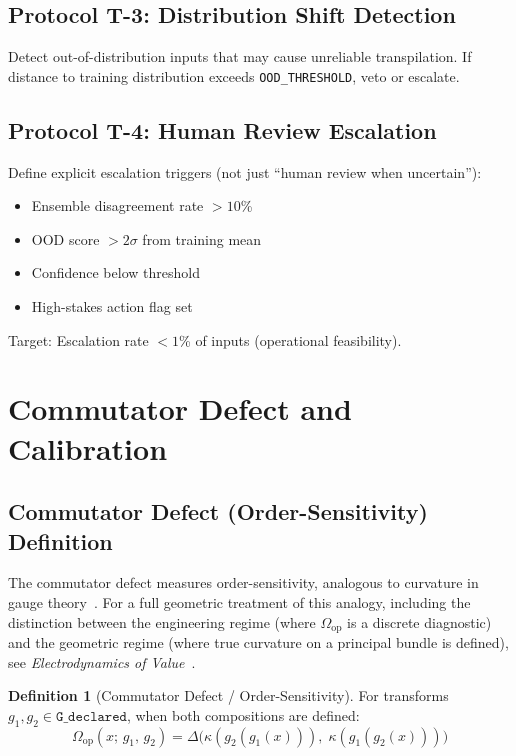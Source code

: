 \documentclass[11pt,letterpaper]{article}
\theoremstyle{definition}
\newtheorem{definition}[theorem]{Definition}
\theoremstyle{remark}
\begin{document}
\subsection{Protocol T-3: Distribution Shift Detection}

Detect out-of-distribution inputs that may cause unreliable transpilation. If distance to training distribution exceeds \texttt{OOD\_THRESHOLD}, veto or escalate.

\subsection{Protocol T-4: Human Review Escalation}

Define explicit escalation triggers (not just ``human review when uncertain''):
\begin{itemize}
\item Ensemble disagreement rate $> 10$\%
\item OOD score $> 2\sigma$ from training mean
\item Confidence below threshold
\item High-stakes action flag set
\end{itemize}
Target: Escalation rate $< 1$\% of inputs (operational feasibility).



\section{Commutator Defect and Calibration}

\subsection{Commutator Defect (Order-Sensitivity) Definition}

The commutator defect measures order-sensitivity, analogous to curvature in gauge theory~\cite{nakahara2003,bleecker1981}. For a full geometric treatment of this analogy, including the distinction between the engineering regime (where $\Omega_{\mathrm{op}}$ is a discrete diagnostic) and the geometric regime (where true curvature on a principal bundle is defined), see \emph{Electrodynamics of Value}~\cite{bond2025eov}.

\begin{definition}[Commutator Defect / Order-Sensitivity]
\label{def:commutator}
For transforms $g_1, g_2 \in \texttt{G\_declared}$, when both compositions are defined:
\[
\Omega_{\mathrm{op}}(x;\, g_1,\, g_2) = \Delta\bigl(\kappa(g_2(g_1(x))),\; \kappa(g_1(g_2(x)))\bigr)
\]
\end{definition}
\end{document}
